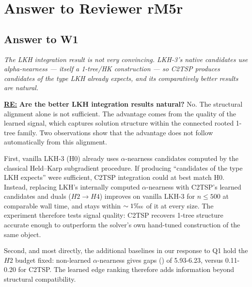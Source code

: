 \section{Answer to Reviewer rM5r}


\subsection{Answer to W1}

\textit{The LKH integration result is not very convincing. LKH-3's native candidates use alpha-nearness — itself a 1-tree/HK construction — so C2TSP produces candidates of the type LKH already expects, and its comparatively better results are natural.}

\textbf{\underline{RE:}}
\textbf{Are the better LKH integration results natural?}
No. The structural alignment alone is not sufficient. The advantage comes from the quality of the learned signal, which captures solution structure within the connected rooted 1-tree family. 
Two observations show that the advantage does not follow automatically from this alignment.
 
First, vanilla LKH-3 (H0) already uses $\alpha$-nearness candidates computed by the classical Held–Karp subgradient procedure. If producing ``candidates of the type LKH expects'' were sufficient, C2TSP integration could at best match H0. Instead, replacing LKH's internally computed $\alpha$-nearness with C2TSP's learned candidates and duals ($H2\rightarrow H4$) improves on vanilla LKH-3 for $n\leq 500$ at comparable wall time, and stays within $\sim 1\text{\textpertenthousand}$ of it at every size. The experiment therefore tests signal quality: C2TSP recovers 1-tree structure accurate enough to outperform the solver's own hand-tuned construction of the same object.
 

Second, and most directly, the additional baselines in our response to Q1 hold the $H2$ budget fixed: non-learned $\alpha$-nearness gives gaps (\text{\textpertenthousand}) of 5.93-6.23, versus 0.11-0.20 for C2TSP. The learned edge ranking therefore adds information beyond structural compatibility.

